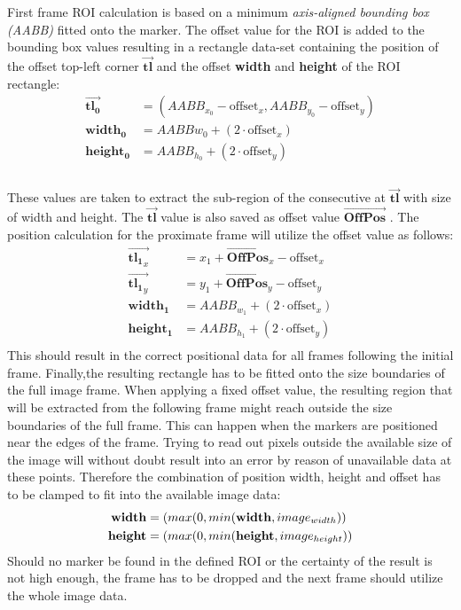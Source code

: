 First frame ROI calculation is based on a minimum \textit{axis-aligned bounding box (AABB)} fitted onto the marker. The offset value for the ROI is added to the bounding box values resulting in a rectangle data-set containing the position of the offset top-left corner $\vec{\mathbf{tl}}$ and the offset 
\textbf{width} and \textbf{height} of the ROI rectangle:\\
\begin{equation}
\begin{split}
\vec{\mathbf{tl_{0}}}&=(AABB_{x_{0}}-\text{offset}_{x},AABB_{y_{0}}-\text{offset}_{y})\\
\mathbf{width_{0}}&=AABB{w_{0}}+(2\cdot\text{offset}_{x})\\
\mathbf{height_{0}}&=AABB_{h_{0}}+(2\cdot\text{offset}_{y})\\
\end{split}
\end{equation}\\
These values are taken to extract the sub-region of the consecutive at $\vec{\mathbf{tl}}$ with size of width and height. The $\vec{\mathbf{tl}}$ value is also saved as offset value $\vec{\mathbf{OffPos}}$ .
The position calculation for the proximate frame will utilize the offset value as follows:
\begin{equation}
\begin{split}
\vec{\mathbf{tl_{1}}_{x}}&=x_{1}+\vec{\mathbf{OffPos}}_{x}-\text{offset}_{x} \\ \vec{\mathbf{tl_{1}}_{y}}&=y_{1}+\vec{\mathbf{OffPos}}_{y}-\text{offset}_{y}\\
\mathbf{width_{1}}&=AABB_{w_{1}}+(2\cdot\text{offset}_{x})\\
\mathbf{height_{1}}&=AABB_{h_{1}}+(2\cdot\text{offset}_{y})\\
\end{split}
\end{equation}
This should result in the correct positional data for all frames following the initial frame.
Finally,the resulting rectangle has to be fitted onto the size boundaries of the full image frame. When applying a fixed offset value, the resulting region that will be extracted from the following frame might reach outside the size boundaries of the full frame. This can happen when the markers are positioned near the edges of the frame. Trying to read out pixels outside the available size of the image will without doubt result into an error by reason of unavailable data at these points. Therefore the combination of position width, height and offset has to be clamped to fit into the available image data:
\begin{equation}
\begin{split}
\textbf{width}&=\text(max(0,min(\mathbf{width},image_{width}))\\
\textbf{height}&=\text(max(0,min(\mathbf{height},image_{height}))
\end{split}
\end{equation}
Should no marker be found in the defined ROI or the certainty of the result is not high enough, the frame has to be dropped and the next frame should utilize the whole image data.
